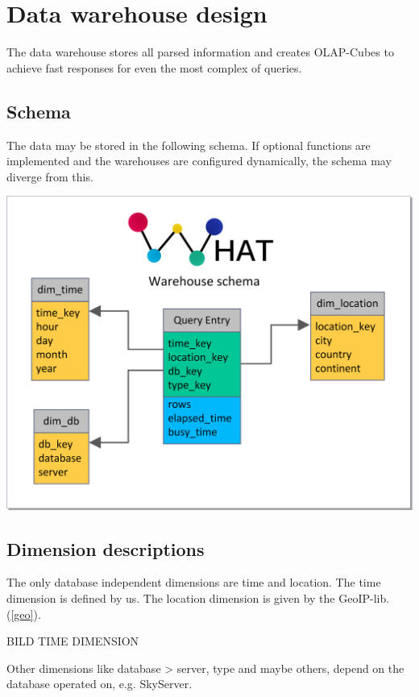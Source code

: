 \section{Data warehouse design}

The data warehouse stores all parsed information and creates OLAP-Cubes to achieve fast responses 
for even the most complex of queries.

\subsection{Schema}
The data may be stored in the following schema. If optional functions are implemented and
the warehouses are configured dynamically, the schema may diverge from this.
\begin{center}
\includegraphics[width=1\linewidth]{Pictures/WHSchema2.png}
\end{center} 


\subsection{Dimension descriptions}
 The only database independent dimensions are time and location. The time dimension is defined by us. The location 
 dimension is given by the GeoIP-lib. (\ref{geo}).
 
 BILD TIME DIMENSION

Other dimensions like database > server, type and maybe others, 
depend on the database operated on, e.g. SkyServer.


